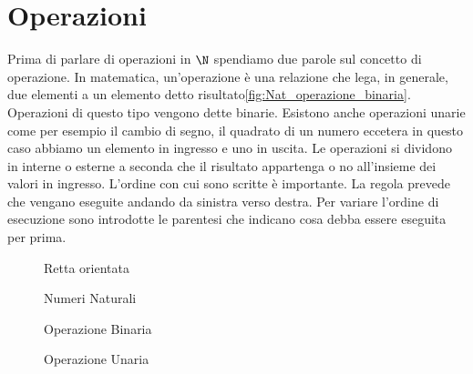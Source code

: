 \section{Operazioni}
Prima di parlare di operazioni in $\N$ spendiamo due parole sul concetto di operazione. In matematica, un'operazione è una relazione che lega, in generale, due elementi a un elemento detto risultato\nobs\vref{fig:Nat_operazione_binaria}. Operazioni di questo tipo vengono dette binarie. Esistono anche operazioni unarie come per esempio il cambio di segno, il quadrato di un numero eccetera in questo caso abbiamo un elemento in ingresso e uno in uscita.   Le operazioni si dividono in interne o esterne a seconda che il risultato appartenga o no all'insieme dei valori in ingresso. L'ordine con cui sono scritte è importante. La regola prevede che vengano eseguite andando da sinistra verso destra. Per variare l'ordine di esecuzione sono introdotte le parentesi che indicano cosa debba essere eseguita per prima.
\begin{figure} 
	\centering

	\caption{Retta orientata}
	\label{fig:NumeriNaturaliRetta}\end{figure}
\begin{figure} 
	\centering

	\caption{Numeri Naturali}
	\label{fig:NumeriNaturali}\end{figure}
\begin{figure} 
	\centering

	\caption{Operazione Binaria}
	\label{fig:Nat_operazione_binaria}\end{figure}
\begin{figure} 
	\centering

	\caption{Operazione Unaria}
	\label{fig:Nat_operazione_unaria}\end{figure}
